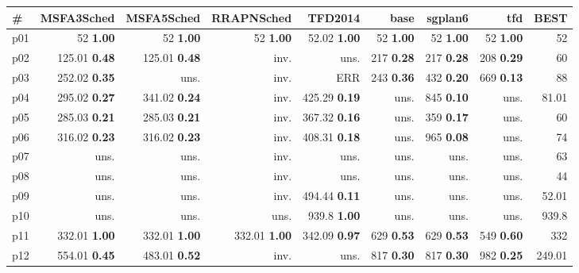 \begin{tabular}{|l|rrrrrrr|r|}
\hline
\textbf{\#} & \textbf{MSFA3Sched} & \textbf{MSFA5Sched} & \textbf{RRAPNSched} & \textbf{TFD2014} & \textbf{base} & \textbf{sgplan6} & \textbf{tfd} & \textbf{BEST}\\
\hline
p01 & {\footnotesize 52} \textbf{1.00} & {\footnotesize 52} \textbf{1.00} & {\footnotesize 52} \textbf{1.00} & {\footnotesize 52.02} \textbf{1.00} & {\footnotesize 52} \textbf{1.00} & {\footnotesize 52} \textbf{1.00} & {\footnotesize 52} \textbf{1.00} & 52\\
p02 & {\footnotesize 125.01} \textbf{0.48} & {\footnotesize 125.01} \textbf{0.48} & inv. & uns. & {\footnotesize 217} \textbf{0.28} & {\footnotesize 217} \textbf{0.28} & {\footnotesize 208} \textbf{0.29} & 60\\
p03 & {\footnotesize 252.02} \textbf{0.35} & uns. & inv. & ERR & {\footnotesize 243} \textbf{0.36} & {\footnotesize 432} \textbf{0.20} & {\footnotesize 669} \textbf{0.13} & 88\\
p04 & {\footnotesize 295.02} \textbf{0.27} & {\footnotesize 341.02} \textbf{0.24} & inv. & {\footnotesize 425.29} \textbf{0.19} & uns. & {\footnotesize 845} \textbf{0.10} & uns. & 81.01\\
p05 & {\footnotesize 285.03} \textbf{0.21} & {\footnotesize 285.03} \textbf{0.21} & inv. & {\footnotesize 367.32} \textbf{0.16} & uns. & {\footnotesize 359} \textbf{0.17} & uns. & 60\\
p06 & {\footnotesize 316.02} \textbf{0.23} & {\footnotesize 316.02} \textbf{0.23} & inv. & {\footnotesize 408.31} \textbf{0.18} & uns. & {\footnotesize 965} \textbf{0.08} & uns. & 74\\
p07 & uns. & uns. & inv. & uns. & uns. & uns. & uns. & 63\\
p08 & uns. & uns. & inv. & uns. & uns. & uns. & uns. & 44\\
p09 & uns. & uns. & inv. & {\footnotesize 494.44} \textbf{0.11} & uns. & uns. & uns. & 52.01\\
p10 & uns. & uns. & uns. & {\footnotesize 939.8} \textbf{1.00} & uns. & uns. & uns. & 939.8\\
p11 & {\footnotesize 332.01} \textbf{1.00} & {\footnotesize 332.01} \textbf{1.00} & {\footnotesize 332.01} \textbf{1.00} & {\footnotesize 342.09} \textbf{0.97} & {\footnotesize 629} \textbf{0.53} & {\footnotesize 629} \textbf{0.53} & {\footnotesize 549} \textbf{0.60} & 332\\
p12 & {\footnotesize 554.01} \textbf{0.45} & {\footnotesize 483.01} \textbf{0.52} & inv. & uns. & {\footnotesize 817} \textbf{0.30} & {\footnotesize 817} \textbf{0.30} & {\footnotesize 982} \textbf{0.25} & 249.01\\

\end{tabular}
